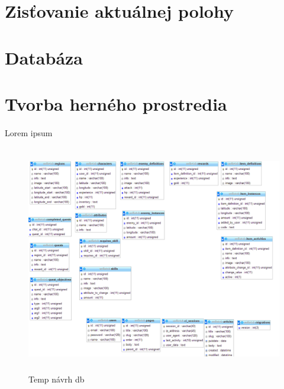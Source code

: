 \section{Zisťovanie aktuálnej polohy}

\section{Databáza}


\section{Tvorba herného prostredia}











\paragraph{}
Lorem ipsum 
\begin{figure}[h]
  \centering
  \includegraphics[height=10cm]{mainmatter/imgs/dbtemp.png}
  \caption{Temp návrh db}
  \label{fig:comenius}
\end{figure}
